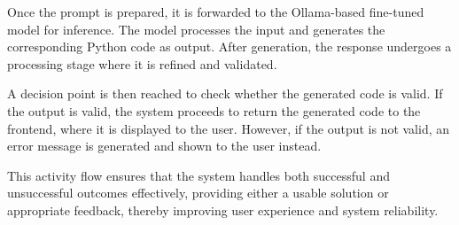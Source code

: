 Once the prompt is prepared, it is forwarded to the Ollama-based fine-tuned model for inference. The model processes the input and generates the corresponding Python code as output. After generation, the response undergoes a processing stage where it is refined and validated.

A decision point is then reached to check whether the generated code is valid. If the output is valid, the system proceeds to return the generated code to the frontend, where it is displayed to the user. However, if the output is not valid, an error message is generated and shown to the user instead.

This activity flow ensures that the system handles both successful and unsuccessful outcomes effectively, providing either a usable solution or appropriate feedback, thereby improving user experience and system reliability.




